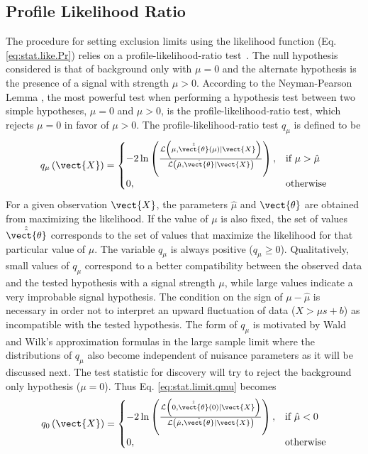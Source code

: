 \subsection{Profile Likelihood Ratio}

The procedure for setting exclusion limits using the likelihood function 
(Eq. \ref{eq:stat.like.Pr})
relies on a profile-likelihood-ratio test~\cite{Cowan:2010js}.
The null hypothesis considered is that of background only with $\mu=0$ and the alternate hypothesis 
is the presence of a signal with strength $\mu>0$.
According to the Neyman-Pearson Lemma \cite{Neyman289}, 
the most powerful test when performing a hypothesis test between two simple hypotheses, $\mu=0$ and $\mu>0$,
is the profile-likelihood-ratio test, which rejects $\mu=0$ in favor of $\mu>0$.
The profile-likelihood-ratio test $q_{\mu}$ is defined to be
\begin{equation}
q_{\mu}  \left( \vect{X} \right)= 
\begin{cases}
  -2\ln\left(
  \frac
      {\mathcal{L} \left( \mu, \hat{\hat{\vect{\theta}}}\left(\mu\right) \rvert \vect{X} \right)}
      {\mathcal{L} \left( \hat{\mu}, \hat{\vect{\theta}} \rvert \vect{X} \right)}
 \right), & \text{if}\ \mu > \hat{\mu} \\
      0, & \text{otherwise}
    \end{cases}
\label{eq:stat.limit.qmu}
\end{equation}
For a given observation $\vect{X}$, the parameters $\hat{\mu}$ and $\vect{\theta}$ are obtained from maximizing the likelihood. 
If the value of $\mu$ is also fixed, the set of values $\hat{\hat{\vect{\theta}}}$ corresponds to the set of values that 
maximize the likelihood for that particular value of $\mu$. The variable $q_{\mu}$ is always positive ($q_{\mu}\geq0$).
Qualitatively, small values of $q_{\mu}$ correspond to a better compatibility between the observed data and the 
tested hypothesis with a signal strength $\mu$, while large values indicate a very improbable signal hypothesis.
The condition on the sign of $ \mu - \hat{\mu}$ is necessary in order not to interpret an upward fluctuation of data 
($X > \mu s + b$) as incompatible with the tested hypothesis. 
The form of $q_{\mu}$ is motivated by Wald and Wilk's \cite{Wilks:1938dza,Wald:ams1943} approximation formulas in the large sample limit
where the distributions of $q_{\mu}$ also become independent of nuisance parameters as it will be discussed next.
The test statistic for discovery will try to reject the background only hypothesis ($\mu=0$). Thus Eq. \ref{eq:stat.limit.qmu} becomes
\begin{equation}
q_{0}  \left( \vect{X} \right)= 
\begin{cases}
  -2\ln\left(
  \frac
      {\mathcal{L} \left( 0, \hat{\hat{\vect{\theta}}}\left(0\right) \rvert \vect{X} \right)}
      {\mathcal{L} \left( \hat{\mu}, \hat{\vect{\theta}} \rvert \vect{X} \right)}
 \right), & \text{if}\ \hat{\mu} < 0 \\
      0, & \text{otherwise}
    \end{cases}
\end{equation}


